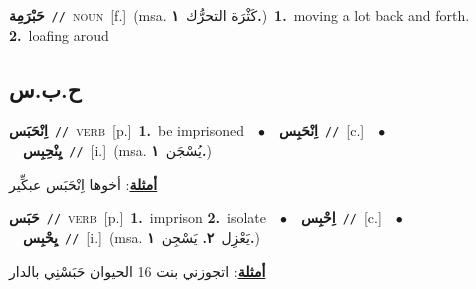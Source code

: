 \documentclass[10pt,a4paper,twoside]{article} %
\begin{document}
\begin{multicols}{2}
{\setlength\topsep{0pt}\textbf{\foreignlanguage{arabic}{حَبْرَمِة}}\ {\color{gray}\texttt{//}\color{black}}\ \textsc{noun}\ [f.]\ \color{gray}(msa. \foreignlanguage{arabic}{كَثْرَة التحرُّك}~\foreignlanguage{arabic}{\textbf{١.}})\color{black}\ \textbf{1.}~moving a lot back and forth.  \textbf{2.}~loafing aroud\ } \vspace{2mm}

\vspace{-3mm}
\subsection*{\color{blue}\foreignlanguage{arabic}{ح.ب.س}\color{blue}{}} 

{\setlength\topsep{0pt}\textbf{\foreignlanguage{arabic}{اِنْحَبَس}}\ {\color{gray}\texttt{//}\color{black}}\ \textsc{verb}\ [p.]\ \textbf{1.}~be imprisoned\ \ $\bullet$\ \ \setlength\topsep{0pt}\textbf{\foreignlanguage{arabic}{اِنْحَبِس}}\ {\color{gray}\texttt{//}\color{black}}\ [c.]\ \ $\bullet$\ \ \setlength\topsep{0pt}\textbf{\foreignlanguage{arabic}{يِنْحِبِس}}\ {\color{gray}\texttt{//}\color{black}}\ [i.]\ \color{gray}(msa. \foreignlanguage{arabic}{يُسْجَن}~\foreignlanguage{arabic}{\textbf{١.}})\color{black}\  \begin{flushright}\color{gray}\foreignlanguage{arabic}{\textbf{\underline{\foreignlanguage{arabic}{أمثلة}}}: أخوها اِنْحَبَس عبكِّير}\end{flushright}\color{black}} \vspace{2mm}

{\setlength\topsep{0pt}\textbf{\foreignlanguage{arabic}{حَبَس}}\ {\color{gray}\texttt{//}\color{black}}\ \textsc{verb}\ [p.]\ \textbf{1.}~imprison  \textbf{2.}~isolate\ \ $\bullet$\ \ \setlength\topsep{0pt}\textbf{\foreignlanguage{arabic}{اِحْبِس}}\ {\color{gray}\texttt{//}\color{black}}\ [c.]\ \ $\bullet$\ \ \setlength\topsep{0pt}\textbf{\foreignlanguage{arabic}{يِحْبِس}}\ {\color{gray}\texttt{//}\color{black}}\ [i.]\ \color{gray}(msa. \foreignlanguage{arabic}{يَعْزِل}~\foreignlanguage{arabic}{\textbf{٢.}}  \foreignlanguage{arabic}{يَسْجِن}~\foreignlanguage{arabic}{\textbf{١.}})\color{black}\  \begin{flushright}\color{gray}\foreignlanguage{arabic}{\textbf{\underline{\foreignlanguage{arabic}{أمثلة}}}: اتجوزني بنت 16 الحيوان حَبَسْنِي بالدار}\end{flushright}\color{black}} \vspace{2mm}


\end{multicols}
\end{document}
